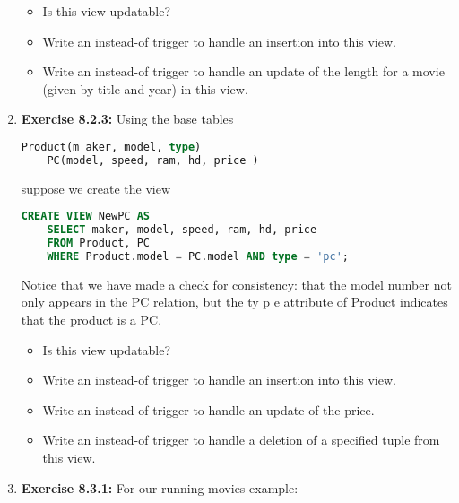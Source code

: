 \documentclass[12pt]{article}
\begin{document}
\begin{enumerate}[1.]
    \bigskip

    \begin{itemize}
        \item Is this view updatable?
        \item Write an instead-of trigger to handle an insertion into this view.
        \item Write an instead-of trigger to handle an update of the length for a movie (given by title and year) in this view.
    \end{itemize}

    \item \textbf{Exercise 8.2.3:} Using the base tables

    \bigskip

    \begin{lstlisting}[language=SQL]
    Product(m aker, model, type)
    PC(model, speed, ram, hd, price )
    \end{lstlisting}

    \bigskip

    suppose we create the view

    \bigskip

    \begin{lstlisting}[language=SQL]
    CREATE VIEW NewPC AS
    SELECT maker, model, speed, ram, hd, price
    FROM Product, PC
    WHERE Product.model = PC.model AND type = 'pc';
    \end{lstlisting}

    \bigskip

    Notice that we have made a check for consistency: that the model number not
    only appears in the PC relation, but the ty p e attribute of Product indicates
    that the product is a PC.

    \bigskip

    \begin{itemize}
        \item Is this view updatable?
        \item Write an instead-of trigger to handle an insertion into this view.
        \item Write an instead-of trigger to handle an update of the price.
        \item Write an instead-of trigger to handle a deletion of a specified tuple from this view.
    \end{itemize}

    \item \textbf{Exercise 8.3.1:} For our running movies example:


\end{enumerate}
\end{document}
